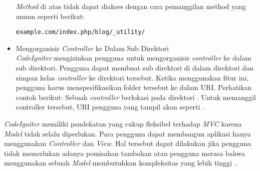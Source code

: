 \begin{itemize}
		\textit{Method} di atas tidak dapat diakses dengan cara pemanggilan method yang umum seperti berikut:
		\begin{lstlisting}[basicstyle=\ttfamily, frame=single,
columns=fullflexible, keepspaces=true, breaklines=true]
example.com/index.php/blog/_utility/
\end{lstlisting}
		
		\item Mengorganisir \textit{Controller} ke Dalam Sub Direktori \\
		\textit{CodeIgniter} mengizinkan pengguna untuk mengorganisir \textit{controller} ke dalam sub direktori. Pengguna dapat membuat sub direktori di dalam direktori  dan simpan kelas \textit{controller} ke direktori tersebut. Ketika menggunakan fitur ini, pengguna harus menspesifikasikan folder tersebut ke dalam URI. Perhatikan contoh berikut:
		Sebuah \textit{controller} berlokasi pada direktori . Untuk memanggil controller tersebut, URI pengguna yang tampil akan seperti .
	\end{itemize}

\textit{CodeIgniter} memiliki pendekatan yang cukup fleksibel terhadap \textit{MVC} karena \textit{Model} tidak selalu diperlukan. Para pengguna dapat membangun aplikasi hanya menggunakan \textit{Controller} dan \textit{View}. Hal tersebut dapat dilakukan jika pengguna tidak memerlukan adanya pemisahan tambahan atau pengguna merasa bahwa menggunakan sebuah \textit{Model} membutuhkan kompleksitas yang lebih tinggi~\cite{bcit:17:cidoc}. 

